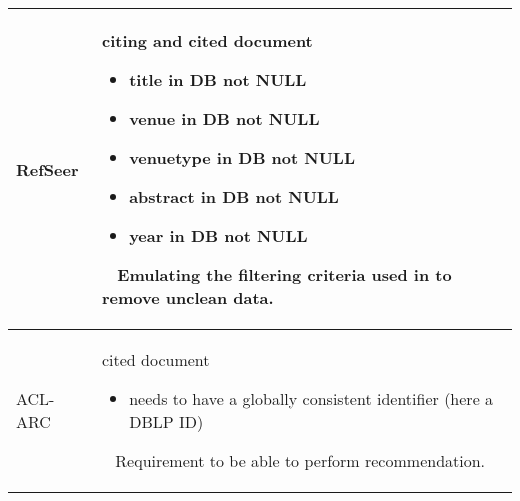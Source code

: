 \begin{table}[]
\begin{center}
\begin{tabular}{lp{11.5cm}}
    RefSeer & citing and cited document
            \begin{itemize}
                \item title in DB not NULL
                \item venue in DB not NULL
                \item venuetype in DB not NULL
                \item abstract in DB not NULL
                \item year in DB not NULL
            \end{itemize}
            \ 
            \newline
            Emulating the filtering criteria used in \cite{Ebesu2017} to remove unclean data.\\
    \midrule
    ACL-ARC & cited document
            \begin{itemize}
                \item needs to have a globally consistent identifier (here a DBLP ID)
            \end{itemize}
            \ 
            \newline
            Requirement to be able to perform recommendation.\\
    \bottomrule
    \end{tabular}
\end{center}
\end{table}
